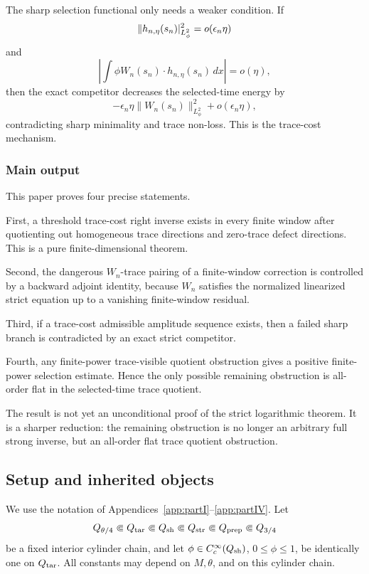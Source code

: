 \documentclass[11pt]{article}
\numberwithin{equation}{section}
\theoremstyle{plain}
\theoremstyle{definition}
\theoremstyle{remark}
\newcommand{\dx}{\,dx}
\begin{document}
The sharp selection functional only needs a weaker condition.  If
\[
        \|h_{n,\eta}(s_n)\\|_{L^2_\phi}^2=o(\epsilon_n\eta)
\]
and
\[
        \left|\int\phi W_n(s_n)\cdot h_{n,\eta}(s_n)\dx\right|=o(\eta),
\]
then the exact competitor decreases the selected-time energy by
\[
        -\epsilon_n\eta\|W_n(s_n)\|_{L^2_\phi}^2+o(\epsilon_n\eta),
\]
contradicting sharp minimality and trace non-loss.  This is the trace-cost mechanism.

\subsubsection{Main output}

This paper proves four precise statements.

First, a threshold trace-cost right inverse exists in every finite window after quotienting out homogeneous trace directions and zero-trace defect directions.  This is a pure finite-dimensional theorem.

Second, the dangerous \(W_n\)-trace pairing of a finite-window correction is controlled by a backward adjoint identity, because \(W_n\) satisfies the normalized linearized strict equation up to a vanishing finite-window residual.

Third, if a trace-cost admissible amplitude sequence exists, then a failed sharp branch is contradicted by an exact strict competitor.

Fourth, any finite-power trace-visible quotient obstruction gives a positive finite-power selection estimate.  Hence the only possible remaining obstruction is all-order flat in the selected-time trace quotient.

The result is not yet an unconditional proof of the strict logarithmic theorem.  It is a sharper reduction: the remaining obstruction is no longer an arbitrary full strong inverse, but an all-order flat trace quotient obstruction.

\subsection{Setup and inherited objects}

We use the notation of Appendices~\ref{app:partI}--\ref{app:partIV}.  Let
\[
        Q_{\theta/4}\Subset Q_{\rm tar}\Subset Q_{\rm sh}\Subset Q_{\rm str}\Subset Q_{\rm prep}\Subset Q_{3/4}
\]
be a fixed interior cylinder chain, and let \(\phi\in C_c^\infty(Q_{\rm sh})\), \(0\le\phi\le1\), be identically one on \(Q_{\rm tar}\).  All constants may depend on \(M,\theta\), and on this cylinder chain.
\end{document}
